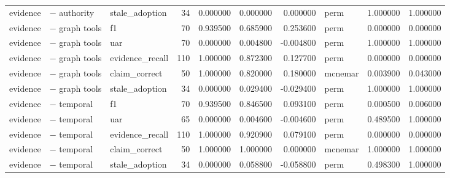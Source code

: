 \begin{table}
\begin{tabular}{lllrrrrlrr}
evidence & − authority & stale\_adoption & 34 & 0.000000 & 0.000000 & 0.000000 & perm & 1.000000 & 1.000000 \\
evidence & − graph tools & f1 & 70 & 0.939500 & 0.685900 & 0.253600 & perm & 0.000000 & 0.000000 \\
evidence & − graph tools & uar & 70 & 0.000000 & 0.004800 & -0.004800 & perm & 1.000000 & 1.000000 \\
evidence & − graph tools & evidence\_recall & 110 & 1.000000 & 0.872300 & 0.127700 & perm & 0.000000 & 0.000000 \\
evidence & − graph tools & claim\_correct & 50 & 1.000000 & 0.820000 & 0.180000 & mcnemar & 0.003900 & 0.043000 \\
evidence & − graph tools & stale\_adoption & 34 & 0.000000 & 0.029400 & -0.029400 & perm & 1.000000 & 1.000000 \\
evidence & − temporal & f1 & 70 & 0.939500 & 0.846500 & 0.093100 & perm & 0.000500 & 0.006000 \\
evidence & − temporal & uar & 65 & 0.000000 & 0.004600 & -0.004600 & perm & 0.489500 & 1.000000 \\
evidence & − temporal & evidence\_recall & 110 & 1.000000 & 0.920900 & 0.079100 & perm & 0.000000 & 0.000000 \\
evidence & − temporal & claim\_correct & 50 & 1.000000 & 1.000000 & 0.000000 & mcnemar & 1.000000 & 1.000000 \\
evidence & − temporal & stale\_adoption & 34 & 0.000000 & 0.058800 & -0.058800 & perm & 0.498300 & 1.000000 \\
\bottomrule
\end{tabular}
\end{table}
